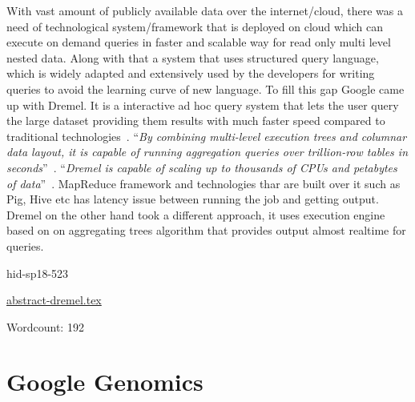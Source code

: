 With vast amount of publicly available data over the internet/cloud, 
there was a need of technological system/framework that is deployed on 
cloud which can execute on demand queries in faster and scalable way 
for read only multi level nested data. Along with that a system that 
uses structured query language, which is widely adapted and extensively 
used by the developers for writing queries to avoid the learning curve of 
new language. To fill this gap Google came up with Dremel. It is a 
interactive ad hoc query system that lets the user query the large 
dataset providing them results with much faster speed compared to 
traditional technologies~\cite{hid-sp18-523-www-dremel}. \color{blue}``\emph{By combining 
multi-level execution trees and columnar data layout, it is capable of 
running aggregation queries over trillion-row tables in 
seconds}''\color{black}~\cite{hid-sp18-523-www-dremel}. \color{blue}``\emph{Dremel is capable of scaling 
up to thousands of CPUs and petabytes of data}''\color{black}~\cite{hid-sp18-523-www-dremel}.
MapReduce framework and technologies thar are built over it such as Pig, Hive 
etc has latency issue between running the job and getting output. 
Dremel on the other hand took a different approach, it uses execution engine
based on on aggregating trees algorithm that provides output almost realtime 
for queries.


\begin{IU}

hid-sp18-523

\href{https://github.com/cloudmesh-community/hid-sp18-523/blob/master//technology/abstract-dremel.tex}{abstract-dremel.tex}

 

Wordcount: 192

\end{IU}

\section{Google Genomics}

